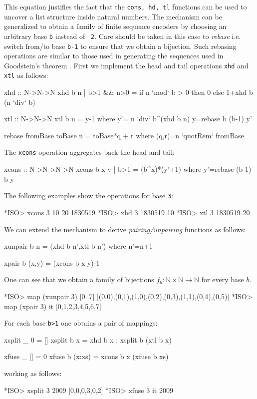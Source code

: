 \documentclass[]{INCLUDES/llncs}
\begin{document}
This equation justifies the fact that the {\tt cons, hd, tl} functions
can be used to uncover a list structure
inside natural numbers. The mechanism can be generalized to obtain a family of
finite sequence encoders by choosing an arbitrary base {\tt b} instead of {\tt
2}. Care should be taken in this case to {\em rebase} i.e. switch from/to base
{\tt b-1} to ensure that we obtain a bijection. 
Such rebasing operations are similar to those used in generating the sequences
used in Goodstein's theorem \cite{goodstein}.
First we implement the head and tail operations {\tt xhd} and {\tt xtl} as
follows:
\begin{code}
xhd :: N->N->N
xhd b n | b>1 && n>0 = 
  if n `mod` b > 0 then 0 else 1+xhd b (n `div` b)

xtl :: N->N->N
xtl b n = y-1 where
  y'= n `div` b^(xhd b n)
  y=rebase b (b-1) y'

rebase fromBase toBase n =  toBase*q + r where
  (q,r)=n `quotRem` fromBase
    
\end{code}
The {\tt xcons} operation aggregates back the head and tail:
\begin{code}
xcons :: N->N->N->N
xcons b x y | b>1 = (b^x)*(y'+1) where
  y'=rebase (b-1) b y
\end{code}
The following examples show the operations for base {\tt 3}:
\begin{codex}
*ISO> xcons 3 10 20
1830519
*ISO> xhd 3 1830519
10
*ISO> xtl 3 1830519
20
\end{codex}
We can extend the mechanism to derive {\em pairing/unpairing} functions as
follows:
\begin{code}
xunpair b n = (xhd b n',xtl b n') where n'=n+1

xpair b (x,y) = (xcons b x y)-1
\end{code}
One can see that we obtain a family of bijections  
$f_b: \mathbb{N} \times \mathbb{N} \rightarrow \mathbb{N}$ for every
base $b$.
\begin{codex}
*ISO> map (xunpair 3) [0..7]
[(0,0),(0,1),(1,0),(0,2),(0,3),(1,1),(0,4),(0,5)]
*ISO> map (xpair 3) it
[0,1,2,3,4,5,6,7]
\end{codex}
For each base {\tt b>1} one obtains a pair of mappings:
\begin{code}
xsplit _ 0 = []
xsplit b x = xhd b x : xsplit b (xtl b x)
 
xfuse _ [] = 0
xfuse b (x:xs) = xcons b x (xfuse b xs)
\end{code}
working as follows:
\begin{codex}
*ISO> xsplit 3 2009
[0,0,0,3,0,2]
*ISO> xfuse 3 it
2009
\end{codex}
\end{document}
